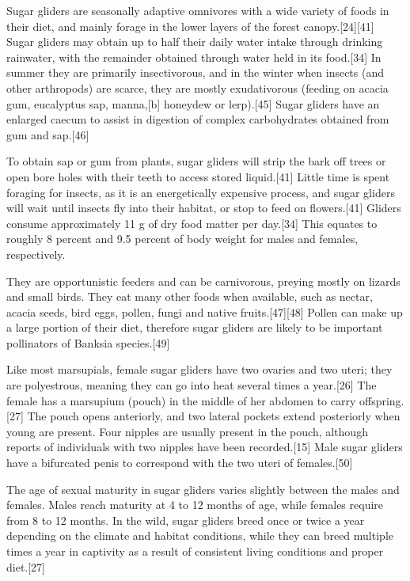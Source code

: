 \documentclass[twoside, 12pt, letterpaper]{report}\usepackage[]{graphicx}\usepackage[]{color}
\begin{document}
\begin{multicols*}{2}
Sugar gliders are seasonally adaptive omnivores with a wide variety of foods in their diet, and mainly forage in the lower layers of the forest canopy.[24][41] Sugar gliders may obtain up to half their daily water intake through drinking rainwater, with the remainder obtained through water held in its food.[34] In summer they are primarily insectivorous, and in the winter when insects (and other arthropods) are scarce, they are mostly exudativorous (feeding on acacia gum, eucalyptus sap, manna,[b] honeydew or lerp).[45] Sugar gliders have an enlarged caecum to assist in digestion of complex carbohydrates obtained from gum and sap.[46]

To obtain sap or gum from plants, sugar gliders will strip the bark off trees or open bore holes with their teeth to access stored liquid.[41] Little time is spent foraging for insects, as it is an energetically expensive process, and sugar gliders will wait until insects fly into their habitat, or stop to feed on flowers.[41] Gliders consume approximately 11 g of dry food matter per day.[34] This equates to roughly 8 percent and 9.5 percent of body weight for males and females, respectively.

They are opportunistic feeders and can be carnivorous, preying mostly on lizards and small birds. They eat many other foods when available, such as nectar, acacia seeds, bird eggs, pollen, fungi and native fruits.[47][48] Pollen can make up a large portion of their diet, therefore sugar gliders are likely to be important pollinators of Banksia species.[49]

Like most marsupials, female sugar gliders have two ovaries and two uteri; they are polyestrous, meaning they can go into heat several times a year.[26] The female has a marsupium (pouch) in the middle of her abdomen to carry offspring.[27] The pouch opens anteriorly, and two lateral pockets extend posteriorly when young are present. Four nipples are usually present in the pouch, although reports of individuals with two nipples have been recorded.[15] Male sugar gliders have a bifurcated penis to correspond with the two uteri of females.[50]

The age of sexual maturity in sugar gliders varies slightly between the males and females. Males reach maturity at 4 to 12 months of age, while females require from 8 to 12 months. In the wild, sugar gliders breed once or twice a year depending on the climate and habitat conditions, while they can breed multiple times a year in captivity as a result of consistent living conditions and proper diet.[27]


\end{multicols*}
\end{document}
